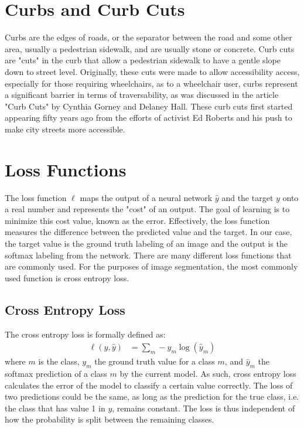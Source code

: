 \section{Curbs and Curb Cuts}\label{section:background-curbs}
Curbs are the edges of roads, or the separator between the road and some other area, usually a pedestrian sidewalk, and are usually stone or concrete.
Curb cuts are "cuts" in the curb that allow a pedestrian sidewalk to have a gentle slope down to street level.
Originally, these cuts were made to allow accessibility access, especially for those requiring wheelchairs, as to a wheelchair user, curbs represent a significant barrier in terms of traversability, as was discussed in the article "Curb Cuts" by Cynthia Gorney and Delaney Hall. These curb cuts first started appearing fifty years ago from the efforts of activist Ed Roberts and his push to make city streets more accessible.

\section{Loss Functions}\label{section:background-loss}
The loss function $\ell$ maps the output of a neural network $\hat{y}$ and the target $y$ onto a real number and represents the "cost" of an output.
The goal of learning is to minimize this cost value, known as the error.
Effectively, the loss function measures the difference between the predicted value and the target.
In our case, the target value is the ground truth labeling of an image and the output is the softmax labeling from the network.
There are many different loss functions that are commonly used. For the purposes of image segmentation, the most commonly used function is cross entropy loss.

\subsection{Cross Entropy Loss}\label{section:background-crossentropy}
The cross entropy loss is formally defined as:
\begin{align}
	\ell(y, \hat{y}) &=\sum_{m}-y_m\log(\hat{y}_m)
\end{align}
where $m$ is the class, $y_m$ the ground truth value for a class $m$, and $\hat{y}_m$ the softmax prediction of a class $m$ by the current model. 
As such, cross entropy loss calculates the error of the model to classify a certain value correctly.
The loss of two predictions could be the same, as long as the prediction for the true class, i.e. the class that has value 1 in $y$, remains constant.
The loss is thus independent of how the probability is split between the remaining classes.

